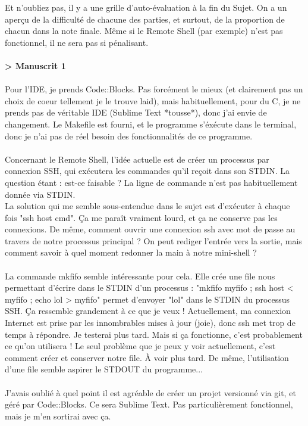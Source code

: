Et n'oubliez pas, il y a une grille d'auto-évaluation à la fin du Sujet. On a un aperçu de la difficulté de chacune des parties, et surtout, de la proportion de chacun dans la note finale. Même si le Remote Shell (par exemple) n'est pas fonctionnel, il ne sera pas si pénalisant.
\\\\
\textbf{> Manuscrit 1}
\\\\
Pour l'IDE, je prends Code::Blocks. Pas forcément le mieux (et clairement pas un choix de coeur tellement je le trouve laid), mais habituellement, pour du C, je ne prends pas de véritable IDE (Sublime Text *tousse*), donc j'ai envie de changement. Le Makefile est fourni, et le programme s'éxécute dans le terminal, donc je n'ai pas de réel besoin des fonctionnalités de ce programme.
\\\\
Concernant le Remote Shell, l'idée actuelle est de créer un processus par connexion SSH, qui exécutera les commandes qu'il reçoit dans son STDIN. La question étant : est-ce faisable ? La ligne de commande n'est pas habituellement donnée via STDIN.
\\La solution qui me semble sous-entendue dans le sujet est d'exécuter à chaque fois "ssh host cmd". Ça me paraît vraiment lourd, et ça ne conserve pas les connexions. De même, comment ouvrir une connexion ssh avec mot de passe au travers de notre processus principal ? On peut rediger l'entrée vers la sortie, mais comment savoir à quel moment redonner la main à notre mini-shell ?
\\\\
La commande mkfifo semble intéressante pour cela. Elle crée une file nous permettant d'écrire dans le STDIN d'un processus : "mkfifo myfifo ; ssh host < myfifo ; echo lol > myfifo" permet d'envoyer "lol" dans le STDIN du processus SSH. Ça ressemble grandement à ce que je veux ! Actuellement, ma connexion Internet est prise par les innombrables mises à jour (joie), donc ssh met trop de temps à répondre. Je testerai plus tard. Mais si ça fonctionne, c'est probablement ce qu'on utilisera ! Le seul problème que je peux y voir actuellement, c'est comment créer et conserver notre file. À voir plus tard. De même, l'utilisation d'une file semble aspirer le STDOUT du programme...
\\\\
J'avais oublié à quel point il est agréable de créer un projet versionné via git, et géré par Code::Blocks. Ce sera Sublime Text. Pas particulièrement fonctionnel, mais je m'en sortirai avec ça.
